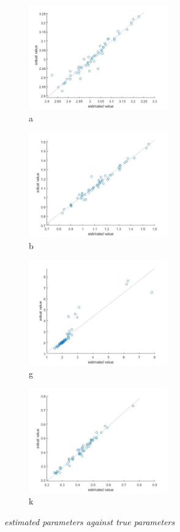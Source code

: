 \documentclass[12,fleqn]{article}
\theoremstyle{definition}
\theoremstyle{plain}
\begin{document}
\begin{figure}[H]
\centering
\begin{subfigure}{6cm}
\centering
\includegraphics[width=6cm]{gk_est_a.jpg}
\caption{a}
\end{subfigure}
\begin{subfigure}{6cm}
\centering
\includegraphics[width=6cm]{gk_est_b.jpg}
\caption{b}
\end{subfigure}
\begin{subfigure}{6cm}
\centering
\includegraphics[width=6cm]{gk_est_g.jpg}
\caption{g}
\end{subfigure}
\begin{subfigure}{6cm}
\centering
\includegraphics[width=6cm]{gk_est_k.jpg}
\caption{k}
\end{subfigure}
\caption{\textit{estimated parameters against true parameters}}
\end{figure}
\end{document}
